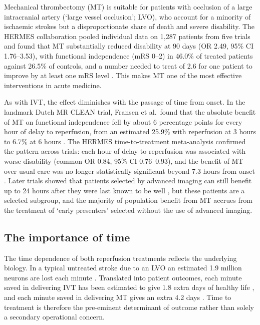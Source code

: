 Mechanical thrombectomy (MT) is suitable for patients with occlusion of a large intracranial artery (`large vessel occlusion'; LVO), who account for a minority of ischaemic strokes but a disproportionate share of death and severe disability. The HERMES collaboration pooled individual data on 1{,}287 patients from five trials and found that MT substantially reduced disability at 90 days (OR 2.49, 95\% CI 1.76--3.53), with functional independence (mRS 0--2) in 46.0\% of treated patients against 26.5\% of controls, and a number needed to treat of 2.6 for one patient to improve by at least one mRS level \cite{goyal2016}. This makes MT one of the most effective interventions in acute medicine.

As with IVT, the effect diminishes with the passage of time from onset. In the landmark Dutch MR CLEAN trial, Fransen et al.\ found that the absolute benefit of MT on functional independence fell by about 6 percentage points for every hour of delay to reperfusion, from an estimated 25.9\% with reperfusion at 3 hours to 6.7\% at 6 hours \cite{fransen_time_2016}. The HERMES time-to-treatment meta-analysis confirmed the pattern across trials: each hour of delay to reperfusion was associated with worse disability (common OR 0.84, 95\% CI 0.76--0.93), and the benefit of MT over usual care was no longer statistically significant beyond 7.3 hours from onset \cite{saver2016}. Later trials showed that patients selected by advanced imaging can still benefit up to 24 hours after they were last known to be well \cite{nogueira2018,albers2018}, but these patients are a selected subgroup, and the majority of population benefit from MT accrues from the treatment of `early presenters' selected without the use of advanced imaging.

\subsection{The importance of time}

The time dependence of both reperfusion treatments reflects the underlying biology. In a typical untreated stroke due to an LVO an estimated 1.9 million neurons are lost each minute \cite{saver2006}. Translated into patient outcomes, each minute saved in delivering IVT has been estimated to give 1.8 extra days of healthy life \cite{meretoja2014}, and each minute saved in delivering MT gives an extra 4.2 days \cite{meretoja2017}. Time to treatment is therefore the pre-eminent determinant of outcome rather than solely a secondary operational concern.

